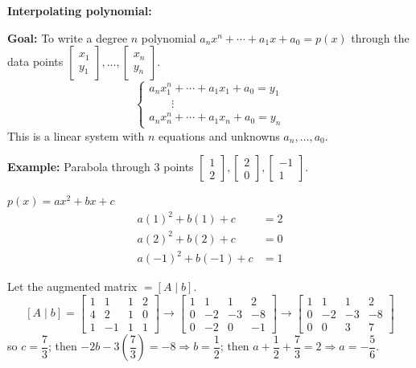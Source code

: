 \documentclass{article}
\begin{document}
\newpage

\textbf{Interpolating polynomial:}

\medskip

\textbf{Goal:} To write a degree $n$ polynomial $a_n x^n + \cdots + a_1 x + a_0 = p(x)$ through the data points $\begin{bmatrix} x_1 \\ y_1 \end{bmatrix}, \ldots, \begin{bmatrix} x_n \\ y_n \end{bmatrix}$.
\[
\begin{cases}
a_n x_1^n + \cdots + a_1 x_1 + a_0 = y_1 \\
\qquad \vdots \\
a_n x_n^n + \cdots + a_1 x_n + a_0 = y_n
\end{cases}
\]
This is a linear system with $n$ equations and unknowns $a_n, \ldots, a_0$.

\medskip

\textbf{Example:} Parabola through 3 points $\begin{bmatrix} 1 \\ 2 \end{bmatrix}, \begin{bmatrix} 2 \\ 0 \end{bmatrix}, \begin{bmatrix} -1 \\ 1 \end{bmatrix}$.

$p(x) = ax^2 + bx + c$
\begin{align*}
a(1)^2 + b(1) + c &= 2 \\
a(2)^2 + b(2) + c &= 0 \\
a(-1)^2 + b(-1) + c &= 1
\end{align*}

Let the augmented matrix $= [A \mid b]$.
\[
[A \mid b] =
\left[ \begin{array}{ccc|c} 1 & 1 & 1 & 2 \\ 4 & 2 & 1 & 0 \\ 1 & -1 & 1 & 1 \end{array} \right]
\to
\left[ \begin{array}{ccc|c} 1 & 1 & 1 & 2 \\ 0 & -2 & -3 & -8 \\ 0 & -2 & 0 & -1 \end{array} \right]
\to
\left[ \begin{array}{ccc|c} 1 & 1 & 1 & 2 \\ 0 & -2 & -3 & -8 \\ 0 & 0 & 3 & 7 \end{array} \right]
\]
so $c = \dfrac{7}{3}$; then $-2b - 3 \left( \dfrac{7}{3} \right) = -8 \Rightarrow b = \dfrac{1}{2}$; then $a + \dfrac{1}{2} + \dfrac{7}{3} = 2 \Rightarrow a = -\dfrac{5}{6}$.
\end{document}
